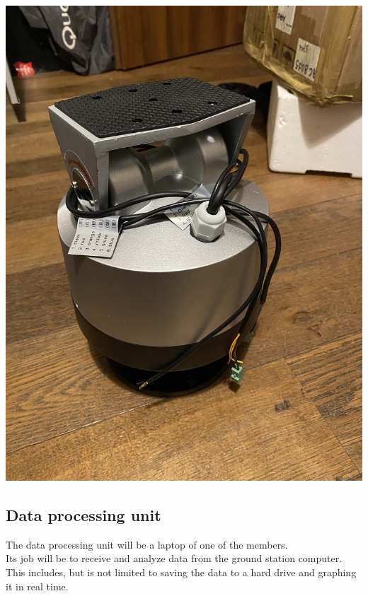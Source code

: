 \documentclass[class=report, crop=false]{standalone}
\begin{document}
\includegraphics[width=\columnwidth]{ext/sattrackrotate.png}
\subsection*{Data processing unit}
The data processing unit will be a laptop of one of the members. \\
Its job will be to receive and analyze data from the ground station computer. \\
This includes, but is not limited to saving the data to a hard drive and graphing it in real time.
\end{document}

